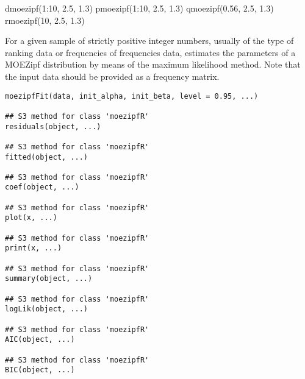 \documentclass[letterpaper]{book}
\begin{document}
%
\begin{Examples}
\begin{ExampleCode}
dmoezipf(1:10, 2.5, 1.3)
pmoezipf(1:10, 2.5, 1.3)
qmoezipf(0.56, 2.5, 1.3)
rmoezipf(10, 2.5, 1.3)

\end{ExampleCode}
\end{Examples}
%
\begin{Description}\relax
For a given sample of strictly positive integer numbers,  usually of the type of ranking data or
frequencies of frequencies data, estimates the parameters of a MOEZipf distribution by means of
the maximum likelihood method. Note that the input data should be provided as a frequency matrix.
\end{Description}
%
\begin{Usage}
\begin{verbatim}
moezipfFit(data, init_alpha, init_beta, level = 0.95, ...)

## S3 method for class 'moezipfR'
residuals(object, ...)

## S3 method for class 'moezipfR'
fitted(object, ...)

## S3 method for class 'moezipfR'
coef(object, ...)

## S3 method for class 'moezipfR'
plot(x, ...)

## S3 method for class 'moezipfR'
print(x, ...)

## S3 method for class 'moezipfR'
summary(object, ...)

## S3 method for class 'moezipfR'
logLik(object, ...)

## S3 method for class 'moezipfR'
AIC(object, ...)

## S3 method for class 'moezipfR'
BIC(object, ...)
\end{verbatim}
\end{Usage}
%
\end{document}
